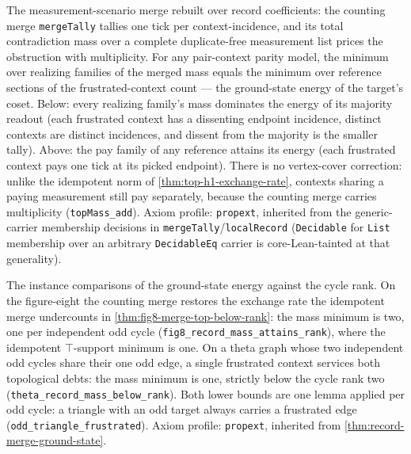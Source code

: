 \begin{theorem}\label{thm:record-merge-ground-state}\leanok{}
The measurement-scenario merge rebuilt over record coefficients: the
counting merge \texttt{mergeTally} tallies one tick per context-incidence,
and its total contradiction mass over a complete duplicate-free measurement
list prices the obstruction with multiplicity. For any pair-context parity
model, the minimum over realizing families of the merged mass equals the
minimum over reference sections of the frustrated-context count --- the
ground-state energy of the target's coset. Below: every realizing family's
mass dominates the energy of its majority readout (each frustrated context
has a dissenting endpoint incidence, distinct contexts are distinct
incidences, and dissent from the majority is the smaller tally). Above: the
pay family of any reference attains its energy (each frustrated context
pays one tick at its picked endpoint). There is no vertex-cover correction:
unlike the idempotent norm of \ref{thm:top-h1-exchange-rate}, contexts
sharing a paying measurement still pay separately, because the counting
merge carries multiplicity (\texttt{topMass\_add}).
Axiom profile: \texttt{propext}, inherited from the generic-carrier
membership decisions in \texttt{mergeTally}/\texttt{localRecord}
(\texttt{Decidable} for \texttt{List} membership over an arbitrary
\texttt{DecidableEq} carrier is core-Lean-tainted at that generality).
\end{theorem}

\begin{theorem}\label{thm:record-mass-vs-rank}\leanok{}
The instance comparisons of the ground-state energy against the cycle rank.
On the figure-eight the counting merge restores the exchange rate the
idempotent merge undercounts in \ref{thm:fig8-merge-top-below-rank}: the
mass minimum is two, one per independent odd cycle
(\texttt{fig8\_record\_mass\_attains\_rank}), where the idempotent
$\top$-support minimum is one. On a theta graph whose two independent odd
cycles share their one odd edge, a single frustrated context services both
topological debts: the mass minimum is one, strictly below the cycle rank
two (\texttt{theta\_record\_mass\_below\_rank}). Both lower bounds are one
lemma applied per odd cycle: a triangle with an odd target always carries a
frustrated edge (\texttt{odd\_triangle\_frustrated}).
Axiom profile: \texttt{propext}, inherited from
\ref{thm:record-merge-ground-state}.
\end{theorem}


